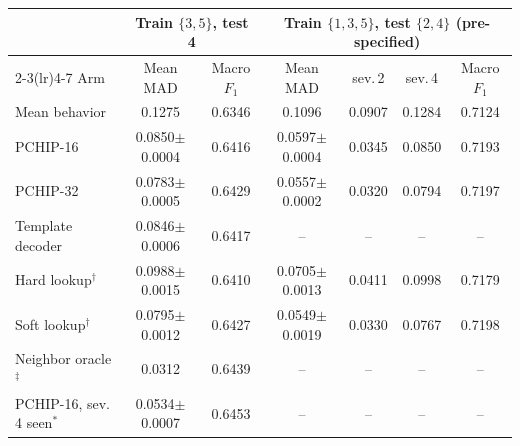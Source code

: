\begin{tabular}{lcccccc}
\toprule
 & \multicolumn{2}{c}{Train $\{3,5\}$, test 4} & \multicolumn{4}{c}{Train $\{1,3,5\}$, test $\{2,4\}$ (pre-specified)} \\
\cmidrule(lr){2-3}\cmidrule(lr){4-7}
Arm & Mean MAD & Macro $F_1$ & Mean MAD & sev.\,2 & sev.\,4 & Macro $F_1$ \\
\midrule
Mean behavior & 0.1275 & 0.6346 & 0.1096 & 0.0907 & 0.1284 & 0.7124 \\
PCHIP-16 & 0.0850$\pm$0.0004 & 0.6416 & 0.0597$\pm$0.0004 & 0.0345 & 0.0850 & 0.7193 \\
PCHIP-32 & 0.0783$\pm$0.0005 & 0.6429 & 0.0557$\pm$0.0002 & 0.0320 & 0.0794 & 0.7197 \\
Template decoder & 0.0846$\pm$0.0006 & 0.6417 & -- & -- & -- & -- \\
Hard lookup$^\dagger$ & 0.0988$\pm$0.0015 & 0.6410 & 0.0705$\pm$0.0013 & 0.0411 & 0.0998 & 0.7179 \\
Soft lookup$^\dagger$ & 0.0795$\pm$0.0012 & 0.6427 & 0.0549$\pm$0.0019 & 0.0330 & 0.0767 & 0.7198 \\
\midrule
Neighbor oracle$^\ddagger$ & 0.0312 & 0.6439 & -- & -- & -- & -- \\
PCHIP-16, sev.\,4 seen$^\ast$ & 0.0534$\pm$0.0007 & 0.6453 & -- & -- & -- & -- \\
\bottomrule
\end{tabular}
